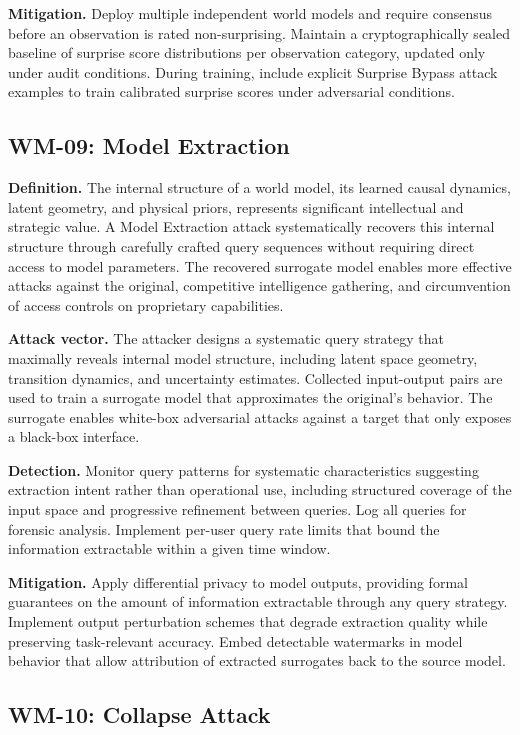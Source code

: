 \documentclass[11pt,a4paper]{article}
\begin{document}
\textbf{Mitigation.} Deploy multiple independent world models and require consensus before an observation is rated non-surprising. Maintain a cryptographically sealed baseline of surprise score distributions per observation category, updated only under audit conditions. During training, include explicit Surprise Bypass attack examples to train calibrated surprise scores under adversarial conditions.

\subsection{WM-09: Model Extraction}

\textbf{Definition.} The internal structure of a world model, its learned causal dynamics, latent geometry, and physical priors, represents significant intellectual and strategic value. A Model Extraction attack systematically recovers this internal structure through carefully crafted query sequences without requiring direct access to model parameters. The recovered surrogate model enables more effective attacks against the original, competitive intelligence gathering, and circumvention of access controls on proprietary capabilities.

\textbf{Attack vector.} The attacker designs a systematic query strategy that maximally reveals internal model structure, including latent space geometry, transition dynamics, and uncertainty estimates. Collected input-output pairs are used to train a surrogate model that approximates the original's behavior. The surrogate enables white-box adversarial attacks against a target that only exposes a black-box interface.

\textbf{Detection.} Monitor query patterns for systematic characteristics suggesting extraction intent rather than operational use, including structured coverage of the input space and progressive refinement between queries. Log all queries for forensic analysis. Implement per-user query rate limits that bound the information extractable within a given time window.

\textbf{Mitigation.} Apply differential privacy to model outputs, providing formal guarantees on the amount of information extractable through any query strategy. Implement output perturbation schemes that degrade extraction quality while preserving task-relevant accuracy. Embed detectable watermarks in model behavior that allow attribution of extracted surrogates back to the source model.

\subsection{WM-10: Collapse Attack}
\end{document}
